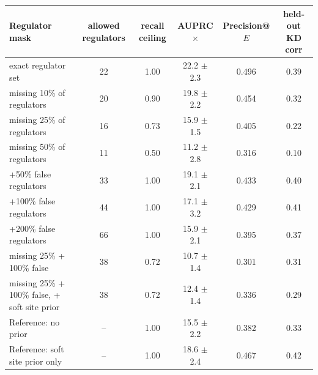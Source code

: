 \begin{tabular}{lccccc}
\toprule
Regulator mask & allowed regulators & recall ceiling & AUPRC$\times$ & Precision@$E$ & held-out KD corr \\
\midrule
exact regulator set & 22 & 1.00 & 22.2 $\pm$ 2.3 & 0.496 & 0.39 \\
missing 10\% of regulators & 20 & 0.90 & 19.8 $\pm$ 2.2 & 0.454 & 0.32 \\
missing 25\% of regulators & 16 & 0.73 & 15.9 $\pm$ 1.5 & 0.405 & 0.22 \\
missing 50\% of regulators & 11 & 0.50 & 11.2 $\pm$ 2.8 & 0.316 & 0.10 \\
+50\% false regulators & 33 & 1.00 & 19.1 $\pm$ 2.1 & 0.433 & 0.40 \\
+100\% false regulators & 44 & 1.00 & 17.1 $\pm$ 3.2 & 0.429 & 0.41 \\
+200\% false regulators & 66 & 1.00 & 15.9 $\pm$ 2.1 & 0.395 & 0.37 \\
missing 25\% + 100\% false & 38 & 0.72 & 10.7 $\pm$ 1.4 & 0.301 & 0.31 \\
missing 25\% + 100\% false, + soft site prior & 38 & 0.72 & 12.4 $\pm$ 1.4 & 0.336 & 0.29 \\
\midrule
Reference: no prior & -- & 1.00 & 15.5 $\pm$ 2.2 & 0.382 & 0.33 \\
Reference: soft site prior only & -- & 1.00 & 18.6 $\pm$ 2.4 & 0.467 & 0.42 \\
\bottomrule
\end{tabular}
